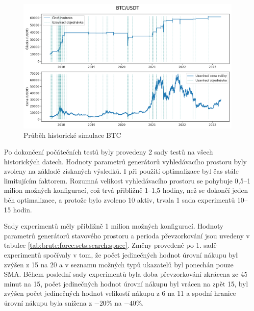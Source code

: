 \begin{figure}[htbp]
\centerline{\includegraphics[scale=0.6]{img/btc-historical-simulation.png}}
\caption{Průběh historické simulace BTC}
\label{fig:btc-historical-simulation}
\end{figure}

Po dokončení počátečních testů byly provedeny 2 sady testů na všech historických datech.
Hodnoty parametrů generátorů vyhledávacího prostoru byly zvoleny na základě získaných výsledků.
I při použití optimalizace byl čas stále limitujícím faktorem.
Rozumná velikost vyhledávacího prostoru se pohybuje 0,5--1 milion možných konfigurací, což trvá přibližně 1--1,5 hodiny, než se dokončí jeden běh optimalizace, a protože bylo zvoleno 10 aktiv, trvala 1 sada experimentů 10--15 hodin.

Sady experimentů měly přibližně 1 milion možných konfigurací.
Hodnoty parametrů generátorů stavového prostoru a perioda převzorkování jsou uvedeny v tabulce \ref{tab:brute:force:sets:search:space}.
Změny provedené po 1. sadě experimentů spočívaly v tom, že počet jedinečných hodnot úrovní nákupu byl zvýšen z 15 na 20 a v seznamu možných typů ukazatelů byl ponechán pouze SMA.
Během poslední sady experimentů byla doba převzorkování zkrácena ze 45 minut na 15, počet jedinečných hodnot úrovní nákupu byl vrácen na zpět 15, byl zvýšen počet jedinečných hodnot velikostí nákupu z 6 na 11 a spodní hranice úrovní nákupu byla snížena z \(-20 \%\) na \(-40 \%\).

